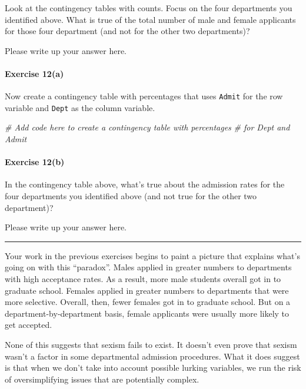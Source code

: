\documentclass[
]{book}
\newenvironment{Shaded}{\begin{snugshade}}{\end{snugshade}}
\newcommand{\CommentTok}[1]{\textcolor[rgb]{0.56,0.35,0.01}{\textit{#1}}}
\begin{document}
Look at the contingency tables with counts. Focus on the four departments you identified above. What is true of the total number of male and female applicants for those four department (and not for the other two departments)?

Please write up your answer here.

\hypertarget{exercise-12a-1}{%
\paragraph*{Exercise 12(a)}\label{exercise-12a-1}}

Now create a contingency table with percentages that uses \texttt{Admit} for the row variable and \texttt{Dept} as the column variable.

\begin{Shaded}
\begin{Highlighting}[]
\CommentTok{\# Add code here to create a contingency table with percentages}
\CommentTok{\# for Dept and Admit}
\end{Highlighting}
\end{Shaded}

\hypertarget{exercise-12b-1}{%
\paragraph*{Exercise 12(b)}\label{exercise-12b-1}}

In the contingency table above, what's true about the admission rates for the four departments you identified above (and not true for the other two department)?

Please write up your answer here.

\begin{center}\rule{0.5\linewidth}{0.5pt}\end{center}

Your work in the previous exercises begins to paint a picture that explains what's going on with this ``paradox''. Males applied in greater numbers to departments with high acceptance rates. As a result, more male students overall got in to graduate school. Females applied in greater numbers to departments that were more selective. Overall, then, fewer females got in to graduate school. But on a department-by-department basis, female applicants were usually more likely to get accepted.

None of this suggests that sexism fails to exist. It doesn't even prove that sexism wasn't a factor in some departmental admission procedures. What it does suggest is that when we don't take into account possible lurking variables, we run the risk of oversimplifying issues that are potentially complex.
\end{document}
